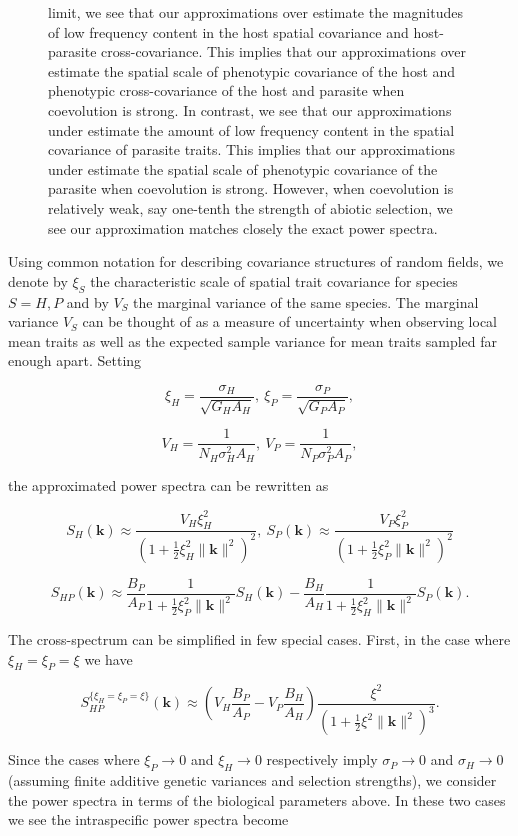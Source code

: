 \documentclass{article}
\begin{document}
\begin{figure}
{limit, we see that our approximations over estimate the magnitudes of
low frequency content in the host spatial covariance and host-parasite
cross-covariance. This implies that our approximations over estimate the
spatial scale of phenotypic covariance of the host and phenotypic
cross-covariance of the host and parasite when coevolution is strong. In
contrast, we see that our approximations under estimate the amount of
low frequency content in the spatial covariance of parasite traits. This
implies that our approximations under estimate the spatial scale of
phenotypic covariance of the parasite when coevolution is strong.
However, when coevolution is relatively weak, say one-tenth the strength
of abiotic selection, we see our approximation matches closely the exact
power spectra.}
\end{figure}

Using common notation for describing covariance structures of random
fields, we denote by \(\xi_S\) the characteristic scale of spatial trait
covariance for species \(S=H,P\) and by \(V_S\) the marginal variance of
the same species. The marginal variance \(V_S\) can be thought of as a
measure of uncertainty when observing local mean traits as well as the
expected sample variance for mean traits sampled far enough apart.
Setting

\[\xi_H=\frac{\sigma_H}{\sqrt{G_HA_H}}, \ \xi_P=\frac{\sigma_P}{\sqrt{G_PA_P}},\]

\[V_H=\frac{1}{N_H\sigma_H^2A_H}, \ V_P=\frac{1}{N_P\sigma_P^2A_P},\]

the approximated power spectra can be rewritten as

\[S_H(\pmb k)\approx \frac{V_H\xi_H^2}{(1+\frac{1}{2}\xi_H^2\|\pmb k\|^2)^2}, \ S_P(\pmb k)\approx \frac{V_P\xi_P^2}{(1+\frac{1}{2}\xi_P^2\|\pmb k\|^2)^2}\]

\[S_{HP}(\pmb k)\approx \frac{B_P}{A_P}\frac{1}{1+\frac{1}{2}\xi_P^2\|\pmb k\|^2}S_H(\pmb k)-\frac{B_H}{A_H}\frac{1}{1+\frac{1}{2}\xi_H^2\|\pmb k\|^2}S_P(\pmb k).\]

The cross-spectrum can be simplified in few special cases. First, in the
case where \(\xi_H=\xi_P=\xi\) we have

\[S_{HP}^{\{\xi_H=\xi_P=\xi\}}(\pmb k)\approx\left(V_H\frac{B_P}{A_P}-V_P\frac{B_H}{A_H}\right)\frac{\xi^2}{\left(1+\tfrac{1}{2}\xi^2\|\pmb k\|^2\right)^3}.\]

Since the cases where \(\xi_P\to0\) and \(\xi_H\to0\) respectively imply
\(\sigma_P\to0\) and \(\sigma_H\to0\) (assuming finite additive genetic
variances and selection strengths), we consider the power spectra in
terms of the biological parameters above. In these two cases we see the
intraspecific power spectra become
\end{document}
